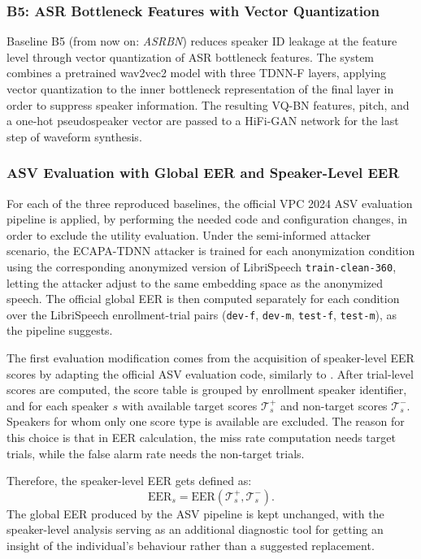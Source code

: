 \documentclass[12pt,leqno,a4paper]{article}
\begin{document}
\subsubsection{B5: ASR Bottleneck Features with Vector Quantization}

Baseline B5 (from now on: \textit{ASRBN}) reduces speaker ID leakage at the 
feature level through vector quantization of ASR bottleneck features. 
The system combines a pretrained wav2vec2 model with three TDNN-F layers, 
applying vector quantization to the inner bottleneck representation of 
the final layer in order to suppress speaker information. The resulting VQ-BN 
features, pitch, and a one-hot pseudospeaker vector are passed to a 
HiFi-GAN network for the last step of waveform synthesis.

\subsubsection{ASV Evaluation with Global EER and Speaker-Level EER}
\label{subsubsec:global_individual_eer}

For each of the three reproduced baselines, the official VPC 2024 ASV evaluation 
pipeline is applied, by performing the needed code and configuration changes, in order to exclude the utility evaluation. Under the
semi-informed attacker scenario, the ECAPA-TDNN attacker
is trained for each anonymization condition using the corresponding 
anonymized version of LibriSpeech \texttt{train-clean-360}, letting the attacker adjust to the same embedding space as the anonymized speech. The official global EER is 
then computed separately for each condition over the LibriSpeech 
enrollment-trial pairs (\texttt{dev-f}, \texttt{dev-m}, \texttt{test-f}, \texttt{test-m}), as the pipeline suggests.

The first evaluation modification comes from the acquisition of speaker-level EER scores by adapting the official ASV evaluation code, similarly to 
\cite{gaznepoglu2025sayexploitinglinguisticcontent}. After trial-level 
scores are computed, the score table is grouped by enrollment speaker 
identifier, and for each speaker $s$ with available target scores 
$\mathcal{T}_s^{+}$ and non-target scores $\mathcal{T}_s^{-}$.
Speakers for whom only one score type is available are excluded. 
The reason for this choice is that in EER calculation, the miss rate computation needs target trials, while the false alarm rate needs the non-target trials.

Therefore, the speaker-level EER gets defined as:
\begin{equation}
\mathrm{EER}_s =
\mathrm{EER}\left(\mathcal{T}_s^{+}, \mathcal{T}_s^{-}\right).
\end{equation} 
The global EER produced by the ASV pipeline is kept unchanged, with the speaker-level analysis 
serving as an additional diagnostic tool for getting an insight of the individual's behaviour rather than a suggested replacement.
\end{document}

